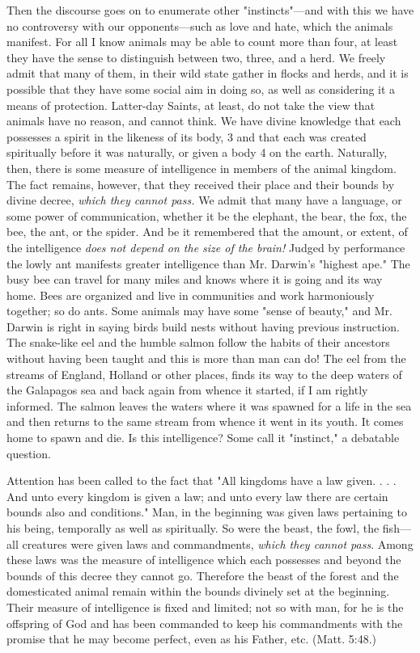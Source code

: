 Then the discourse goes on to enumerate other "instincts"—and with this we have no
controversy with our opponents—such as love and hate, which the animals manifest. For all I
know animals may be able to count more than four, at least they have the sense to distinguish
between two, three, and a herd. We freely admit that many of them, in their wild state gather
in flocks and herds, and it is possible that they have some social aim in doing so, as well as
considering it a means of protection. Latter-day Saints, at least, do not take the view that
animals have no reason, and cannot think. We have divine knowledge that each possesses a
spirit in the likeness of its body, 3 and that each was created spiritually before it was
naturally, or given a body 4 on the earth. Naturally, then, there is some measure of
intelligence in members of the animal kingdom. The fact remains, however, that they
received their place and their bounds by divine decree, \textit{which they cannot pass.} We admit
that many have a language, or some power of communication, whether it be the elephant, the
bear, the fox, the bee, the ant, or the spider. And be it remembered that the amount, or extent,
of the intelligence \textit{does not depend on the size of the brain!} Judged by performance the lowly
ant manifests greater intelligence than Mr. Darwin's "highest ape." The busy bee can travel
for many miles and knows where it is going and its way home. Bees are organized and live in
communities and work harmoniously together; so do ants. Some animals may have some
"sense of beauty," and Mr. Darwin is right in saying birds build nests without having
previous instruction. The snake-like eel and the humble salmon follow the habits of their
ancestors without having been taught and this is more than man can do! The eel from the
streams of England, Holland or other places, finds its way to the deep waters of the
Galapagos sea and back again from whence it started, if I am rightly informed. The salmon
leaves the waters where it was spawned for a life in the sea and then returns to the same
stream from whence it went in its youth. It comes home to spawn and die. Is this
intelligence? Some call it "instinct," a debatable question.

Attention has been called to the fact that "All kingdoms have a law given. . . . And unto every
kingdom is given a law; and unto every law there are certain bounds also and conditions."
Man, in the beginning was given laws pertaining to his being, temporally as well as
spiritually. So were the beast, the fowl, the fish—all creatures were given laws and
commandments, \textit{which they cannot pass}. Among these laws was the measure of intelligence
which each possesses and beyond the bounds of this decree they cannot go. Therefore the
beast of the forest and the domesticated animal remain within the bounds divinely set at the
beginning. Their measure of intelligence is fixed and limited; not so with man, for he is the
offspring of God and has been commanded to keep his commandments with the promise that
he may become perfect, even as his Father, etc. (Matt. 5:48.)

